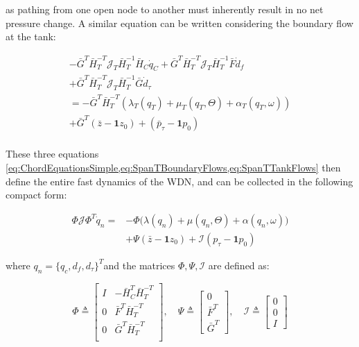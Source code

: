 as pathing from one open node to another must inherently result in no net pressure change. A similar equation can be written considering the boundary flow at the tank:

\begin{equation}\label{eq:SpanTTankFlows}
	\begin{split}
	-\bar{G}^T\bar{H}_T^{-T}\mathcal{J}_T\bar{H}_T^{-1}\bar{H}_C\dot{q}_C + \bar{G}^T\bar{H}_T^{-T}\mathcal{J}_T\bar{H}_T^{-1}\bar{F}\dot{d}_f \\
	+ \bar{G}^T\bar{H}_T^{-T}\mathcal{J}_T\bar{H}_T^{-1}\bar{G}\dot{d}_{\tau} \\
	= -\bar{G}^T\bar{H}_T^{-T}(\lambda_T(q_T)+\mu_T(q_T,\Theta) + \alpha_T(q_T,\omega)) \\
	+ \bar{G}^T(\bar{z} - \mathbf{1}z_0) +	(\bar{p}_\tau - \mathbf{1}p_0) \\	
\end{split}
\end{equation}

These three equations \cref{eq:ChordEquationsSimple,eq:SpanTBoundaryFlows,eq:SpanTTankFlows} then define the entire fast dynamics of the WDN, and can be collected in the following compact form:

\begin{equation}\label{eq:NonLinearModelWithTank}
	\begin{split}
		\Phi\mathcal{J}\Phi^T \dot{q}_n = &-\Phi\Big(\lambda(q_n)+\mu(q_n,\Theta)+\alpha(q_n,\omega)\Big)\\ 
		&+ \Psi(\bar{z}-\mathbf{1}z_0) + \mathcal{I}(p_{\tau}-\mathbf{1}p_0)
	\end{split}
\end{equation}

where $q_n = \{q_c, d_f, d_\tau\}^T$and the matrices $\Phi, \Psi, \mathcal{I}$ are defined as:

\begin{equation}\label{eq:NonLinearModelMatrices}
	\Phi \triangleq 
	\begin{bmatrix} 
		I & -\bar{H}_C^T\bar{H}_T^{-T} \\ 0 & \bar{F}^T\bar{H}_T^{-T} \\ 0  & \bar{G}^T\bar{H}_T^{-T} \\ 
	\end{bmatrix}
	, \quad
	\Psi \triangleq
	\begin{bmatrix}
		0 \\ \bar{F}^T \\ \bar{G}^T
	\end{bmatrix}
	, \quad
	\mathcal{I} \triangleq
	\begin{bmatrix}
		0 \\ 0 \\ I
	\end{bmatrix}
\end{equation}


